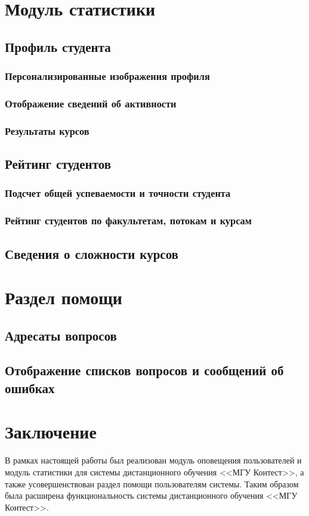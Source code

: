 \documentclass[12pt, a4paper, oneside]{article}
\begin{document}
\section{Модуль статистики}
\subsection{Профиль студента}
\subsubsection{Персонализированные изображения профиля}
\subsubsection{Отображение сведений об активности}
\subsubsection{Результаты курсов}
\subsection{Рейтинг студентов}
\subsubsection{Подсчет общей успеваемости и точности студента}
\subsubsection{Рейтинг студентов по факультетам, потокам и курсам}
\subsection{Сведения о сложности курсов}
\newpage

\section{Раздел помощи}
\subsection{Адресаты вопросов}
\subsection{Отображение списков вопросов и сообщений об ошибках}
\newpage

\section{Заключение}
В рамках настоящей работы был реализован модуль оповещения пользователей и модуль статистики для системы дистанционного обучения <<МГУ Контест>>, а также усовершенствован раздел помощи пользователям системы. Таким образом была расширена функциональность системы дистанционного обучения <<МГУ Контест>>.
\newpage
\end{document}
